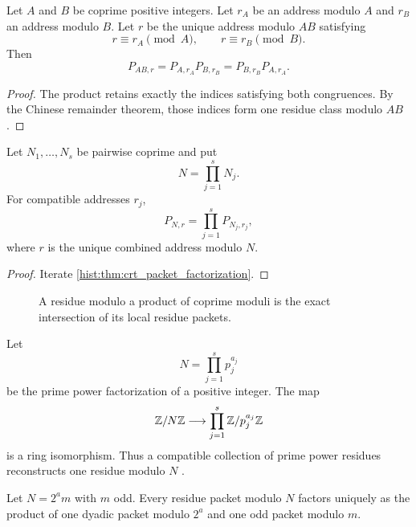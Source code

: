 \begin{histtheorem}\label{hist:thm:crt_packet_factorization}
Let \(A\) and \(B\) be coprime positive integers. Let \(r_A\) be an address modulo \(A\) and \(r_B\) an address modulo \(B\). Let \(r\) be the unique address modulo \(AB\) satisfying
\[
r\equiv r_A\pmod A,
\qquad
r\equiv r_B\pmod B.
\]
Then
\[
\boxed{
P_{AB,r}
=
P_{A,r_A}P_{B,r_B}
=
P_{B,r_B}P_{A,r_A}.
}
\]
\end{histtheorem}

\begin{proof}
The product retains exactly the indices satisfying both congruences. By the Chinese remainder theorem, those indices form one residue class modulo \(AB\) \cite{IrelandRosen1990}.
\end{proof}

\begin{histcorollary}\label{hist:cor:many_crt_packets}
Let \(N_1,\ldots,N_s\) be pairwise coprime and put
\[
N=\prod_{j=1}^{s}N_j.
\]
For compatible addresses \(r_j\),
\[
\boxed{
P_{N,r}
=
\prod_{j=1}^{s}P_{N_j,r_j},
}
\]
where \(r\) is the unique combined address modulo \(N\).
\end{histcorollary}

\begin{proof}
Iterate \cref{hist:thm:crt_packet_factorization}.
\end{proof}

\begin{figure}[t]
\centering
{}
\caption{A residue modulo a product of coprime moduli is the exact intersection of its local residue packets.}
\label{hist:fig:crt_packets}
\end{figure}

\begin{histstandardfact}\label{hist:fact:finite_local_reconstruction}
Let
\[
N=\prod_{j=1}^{s}p_j^{a_j}
\]
be the prime power factorization of a positive integer. The map
\[
\mathbb Z/N\mathbb Z
\longrightarrow
\prod_{j=1}^{s}\mathbb Z/p_j^{a_j}\mathbb Z
\]
is a ring isomorphism. Thus a compatible collection of prime power residues reconstructs one residue modulo \(N\) \cite{IrelandRosen1990}.
\end{histstandardfact}

\begin{histproposition}\label{hist:prop:dyadic_odd_refinement}
Let \(N=2^am\) with \(m\) odd. Every residue packet modulo \(N\) factors uniquely as the product of one dyadic packet modulo \(2^a\) and one odd packet modulo \(m\).
\end{histproposition}

